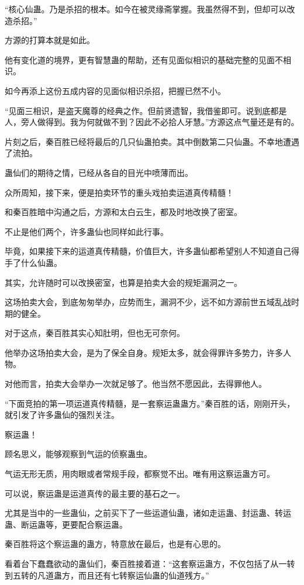 \begin{this_body}
“核心仙蛊。乃是杀招的根本。如今在被灵缘斋掌握。我虽然得不到，但却可以改造杀招。”

方源的打算本就是如此。

他有变化道的境界，更有智慧蛊的帮助，还有见面似相识的基础完整的见面不相识。

如今再添上这份五成内容的见面似相识杀招，把握已然不小。

“见面三相识，是盗天魔尊的经典之作。但前贤遗智，我借鉴即可。说到底都是人，旁人做得到。我为何就做不到？因此不必拾人牙慧。”方源这点气量还是有的。

片刻之后，秦百胜已经将最后的几只仙蛊拍卖。其中倒数第二只仙蛊。不幸地遭遇了流拍。

蛊仙们的期待之情，已经从各自的目光中喷薄而出。

众所周知，接下来，便是拍卖环节的重头戏拍卖运道真传精髓！

和秦百胜暗中沟通之后，方源和太白云生，都及时地改换了密室。

不止是他们两个，许多蛊仙也同样如此行事。

毕竟，如果接下来的运道真传精髓，价值巨大，许多蛊仙都希望别人不知道自己得手了什么仙蛊。

其实，允许随时可以改换密室，也算是拍卖大会的规矩漏洞之一。

这场拍卖大会，到底匆匆举办，应势而生，漏洞不少，远不如方源前世五域乱战时期的健全。

对于这点，秦百胜其实心知肚明，但也无可奈何。

他举办这场拍卖大会，是为了保全自身。规矩太多，就会得罪许多势力，许多人物。

对他而言，拍卖大会举办一次就足够了。他当然不愿因此，去得罪他人。

“下面竞拍的第一项运道真传精髓，是一套察运蛊蛊方。”秦百胜的话，刚刚开头，就引发了许多蛊仙的强烈关注。

察运蛊！

顾名思义，能够观察到气运的侦察蛊虫。

气运无形无质，用肉眼或者常规手段，都察觉不出。唯有用这察运蛊方可。

可以说，察运蛊是运道真传的最主要的基石之一。

尤其是当中的一些蛊仙，之前买下了一些运道仙蛊，诸如走运蛊、封运蛊、转运蛊、断运蛊等，更要配合察运蛊。

秦百胜将这个察运蛊的蛊方，特意放在最后，也是有心思的。

看着台下蠢蠢欲动的蛊仙们，秦百胜接着道：“这套察运蛊方，不仅包括了从一转到五转的凡道蛊方，而且还有七转察运仙蛊的仙道残方。”


\end{this_body}
